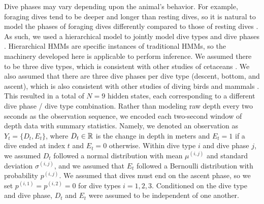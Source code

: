 Dive phases may vary depending upon the animal's behavior. For example, foraging dives tend to be deeper and longer than resting dives, so it is natural to model the phases of foraging dives differently compared to those of resting dives \citep{Tennessen:2019b}. As such, we used a hierarchical model to jointly model dive types and dive phases \citep{Barajas:2017}. Hierarchical HMMs are specific instances of traditional HMMs, so the machinery developed here is applicable to perform inference. 
%
We assumed there to be three dive types, which is consistent with other studies of cetaceans \citep[e.g. resting, foraging and traveling,][]{Barajas:2017}. We also assumed that there are three dive phases per dive type (descent, bottom, and ascent), which is also consistent with other studies of diving birds and mammals \citep[e.g.][]{Vivant:2014}. This resulted in a total of $N = 9$ hidden states, each corresponding to a different dive phase / dive type combination.
%
Rather than modeling raw depth every two seconds as the observation sequence, we encoded each two-second window of depth data with summary statistics. Namely, we denoted an observation as $Y_t = \{D_t,E_t\}$, where $D_t \in \mathbb{R}$ is the change in depth in meters and $E_t = 1$ if a dive ended at index $t$ and $E_t = 0$ otherwise. 
Within dive type $i$ and dive phase $j$, we assumed $D_t$ followed a normal distribution with mean $\mu^{(i,j)}$ and standard deviation $\sigma^{(i,j)}$, and we assumed that $E_t$ followed a Bernoulli distribution with probability $p^{(i,j)}$. We assumed that dives must end on the ascent phase, so we set $p^{(i,1)} = p^{(i,2)} = 0$ for dive types $i = 1,2,3$. Conditioned on the dive type and dive phase, $D_t$ and $E_t$ were assumed to be independent of one another.

